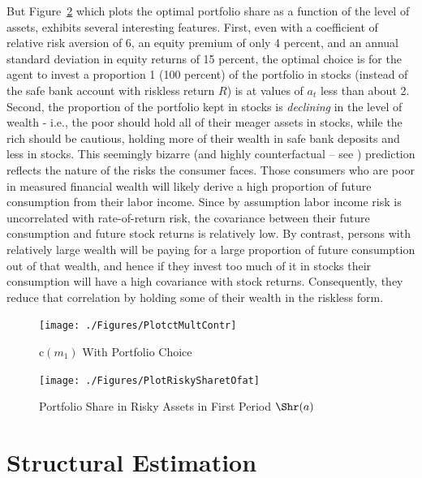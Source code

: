 \documentclass[titlepage, headings=optiontotocandhead]{econtex}
\begin{document}
But Figure~\ref{fig:PlotRiskySharetOfat} which plots the optimal portfolio share as a function of the level of assets, exhibits several interesting features.  First, even with a coefficient of relative risk aversion of 6, an equity premium of only 4 percent, and an annual standard deviation in equity returns of 15 percent, the optimal choice is for the agent to invest a proportion 1 (100 percent) of the portfolio in stocks (instead of the safe bank account with riskless return $R$) is at values of $a_{t}$ less than about 2.  Second, the proportion of the portfolio kept in stocks is \textit{declining} in the level of wealth - i.e., the poor should hold all of their meager assets in stocks, while the rich should be cautious, holding more of their wealth in safe bank deposits and less in stocks.  This seemingly bizarre (and highly counterfactual -- see \cite{carroll:richportfolios}) prediction reflects the nature of the risks the consumer faces.  Those consumers who are poor in measured financial wealth will likely derive a high proportion of future consumption from their labor income.  Since by assumption labor income risk is uncorrelated with rate-of-return risk, the covariance between their future consumption and future stock returns is relatively low.  By contrast, persons with relatively large wealth will be paying for a large proportion of future consumption out of that wealth, and hence if they invest too much of it in stocks their consumption will have a high covariance with stock returns.  Consequently, they reduce that correlation by holding some of their wealth in the riskless form.

\hypertarget{PlotctMultContr}{}
\begin{figure}
  \texttt{[image: ./Figures/PlotctMultContr]}
  \caption{$\mathrm{c}(m_{1})$ With Portfolio Choice}
  \label{fig:PlotctMultContr}
\end{figure}

\hypertarget{PlotRiskySharetOfat}{}
\begin{figure}
  \texttt{[image: ./Figures/PlotRiskySharetOfat]}
  \caption{Portfolio Share in Risky Assets in First Period $\Shr(a)$}
  \label{fig:PlotRiskySharetOfat}
\end{figure}

\hypertarget{structural-estimation}{}
\section{Structural Estimation}\label{sec:structural-estimation}
\end{document}
